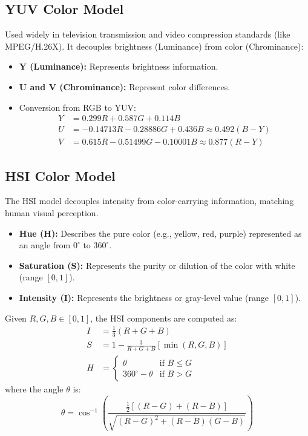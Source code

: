 \documentclass[12pt,a4paper]{article}
\begin{document}
\subsection{YUV Color Model}
Used widely in television transmission and video compression standards (like MPEG/H.26X). It decouples brightness (Luminance) from color (Chrominance):
\begin{itemize}[leftmargin=*, itemsep=3.5pt]
  \item \textbf{Y (Luminance):} Represents brightness information.
  \item \textbf{U and V (Chrominance):} Represent color differences.
  \item Conversion from RGB to YUV:
    \begin{align}
      Y &= 0.299R + 0.587G + 0.114B \\
      U &= -0.14713R - 0.28886G + 0.436B \approx 0.492(B - Y) \\
      V &= 0.615R - 0.51499G - 0.10001B \approx 0.877(R - Y)
    \end{align}
\end{itemize}

\subsection{HSI Color Model}
The HSI model decouples intensity from color-carrying information, matching human visual perception.

\begin{tcolorbox}[defbox, title={HSI Components}]
\begin{itemize}[leftmargin=*, itemsep=3pt]
  \item \textbf{Hue (H):} Describes the pure color (e.g., yellow, red, purple) represented as an angle from $0^\circ$ to $360^\circ$.
  \item \textbf{Saturation (S):} Represents the purity or dilution of the color with white (range $[0,1]$).
  \item \textbf{Intensity (I):} Represents the brightness or gray-level value (range $[0,1]$).
\end{itemize}
\end{tcolorbox}

\begin{tcolorbox}[formulabox, title={RGB to HSI Conversion Formulas}]
Given $R, G, B \in [0, 1]$, the HSI components are computed as:
\begin{align}
  I &= \frac{1}{3}(R + G + B) \\
  S &= 1 - \frac{3}{R + G + B} \left[ \min(R, G, B) \right] \\
  H &= \begin{cases} \theta & \text{if } B \le G \\ 360^\circ - \theta & \text{if } B > G \end{cases}
\end{align}
where the angle $\theta$ is:
\begin{equation}
  \theta = \cos^{-1} \left( \frac{\frac{1}{2}\left[(R - G) + (R - B)\right]}{\sqrt{(R - G)^2 + (R - B)(G - B)}} \right)
\end{equation}
\end{tcolorbox}
\end{document}
